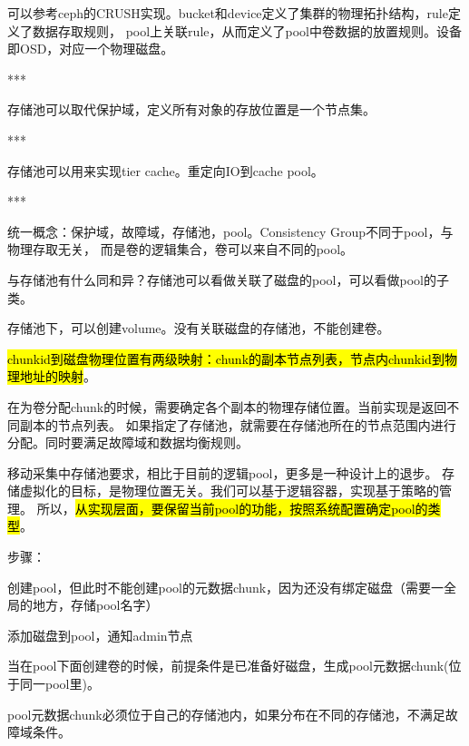 \begin{tcolorbox}

可以参考ceph的CRUSH实现。bucket和device定义了集群的物理拓扑结构，rule定义了数据存取规则，
pool上关联rule，从而定义了pool中卷数据的放置规则。设备即OSD，对应一个物理磁盘。

***

存储池可以取代保护域，定义所有对象的存放位置是一个节点集。

***

存储池可以用来实现tier cache。重定向IO到cache pool。

***

统一概念：保护域，故障域，存储池，pool。Consistency Group不同于pool，与物理存取无关，
而是卷的逻辑集合，卷可以来自不同的pool。

\end{tcolorbox}

与存储池有什么同和异？存储池可以看做关联了磁盘的pool，可以看做pool的子类。


存储池下，可以创建volume。没有关联磁盘的存储池，不能创建卷。

\hl{chunkid到磁盘物理位置有两级映射：chunk的副本节点列表，节点内chunkid到物理地址的映射}。

在为卷分配chunk的时候，需要确定各个副本的物理存储位置。当前实现是返回不同副本的节点列表。
如果指定了存储池，就需要在存储池所在的节点范围内进行分配。同时要满足故障域和数据均衡规则。

\begin{tcolorbox}
移动采集中存储池要求，相比于目前的逻辑pool，更多是一种设计上的退步。
存储虚拟化的目标，是物理位置无关。我们可以基于逻辑容器，实现基于策略的管理。
所以，\hl{从实现层面，要保留当前pool的功能，按照系统配置确定pool的类型}。
\end{tcolorbox}


步骤：
\begin{enumbox}
\item 创建pool，但此时不能创建pool的元数据chunk，因为还没有绑定磁盘（需要一全局的地方，存储pool名字）
\item 添加磁盘到pool，通知admin节点
\item 当在pool下面创建卷的时候，前提条件是已准备好磁盘，生成pool元数据chunk(位于同一pool里)。
\end{enumbox}

pool元数据chunk必须位于自己的存储池内，如果分布在不同的存储池，不满足故障域条件。

